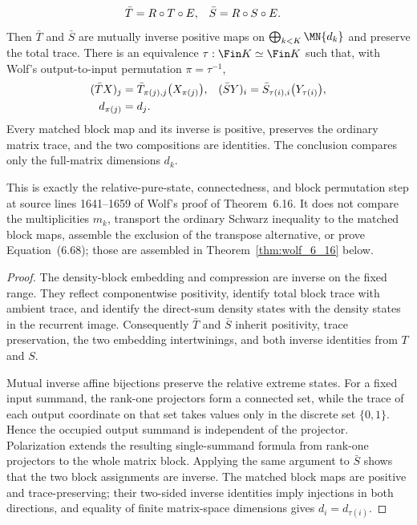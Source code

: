 \begin{theorem}
    \begin{align}
        \bar T&=R\circ T\circ E,
        &
        \bar S&=R\circ S\circ E.
        \notag
    \end{align}
    Then $\bar T$ and $\bar S$ are mutually inverse positive maps on
    $\bigoplus_{k<K}\MN{d_k}$ and preserve the total trace. There is an
    equivalence $\tau:\Fin K\simeq\Fin K$ such that, with Wolf's
    output-to-input permutation $\pi=\tau^{-1}$,
    \begin{align}
        (\bar T X)_j
          &=\bar T_{\pi(j),j}\bigl(X_{\pi(j)}\bigr),
        &
        (\bar S Y)_i
          &=\bar S_{\tau(i),i}\bigl(Y_{\tau(i)}\bigr),
        \notag\\
        d_{\pi(j)}&=d_j.
        \notag
    \end{align}
    Every matched block map and its inverse is positive, preserves the
    ordinary matrix trace, and the two compositions are identities. The
    conclusion compares only the full-matrix dimensions $d_k$.

    This is exactly the relative-pure-state, connectedness, and block
    permutation step at source lines 1641--1659 of Wolf's proof of
    Theorem~6.16. It does not compare the multiplicities $m_k$, transport the
    ordinary Schwarz inequality to the matched block maps, assemble the
    exclusion of the transpose alternative, or prove Equation~(6.68); those
    are assembled in Theorem~\ref{thm:wolf_6_16} below.
\end{theorem}

\begin{proof}
    \leanok
    The density-block embedding and compression are inverse on the fixed
    range. They reflect componentwise positivity, identify total block trace
    with ambient trace, and identify the direct-sum density states with the
    density states in the recurrent image. Consequently $\bar T$ and
    $\bar S$ inherit positivity, trace preservation, the two embedding
    intertwinings, and both inverse identities from $T$ and $S$.

    Mutual inverse affine bijections preserve the relative extreme states.
    For a fixed input summand, the rank-one projectors form a connected set,
    while the trace of each output coordinate on that set takes values only
    in the discrete set $\{0,1\}$. Hence the occupied output summand is
    independent of the projector. Polarization extends the resulting
    single-summand formula from rank-one projectors to the whole matrix
    block. Applying the same argument to $\bar S$ shows that the two block
    assignments are inverse. The matched block maps are positive and
    trace-preserving; their two-sided inverse identities imply injections in
    both directions, and equality of finite matrix-space dimensions gives
    $d_i=d_{\tau(i)}$.
\end{proof}

